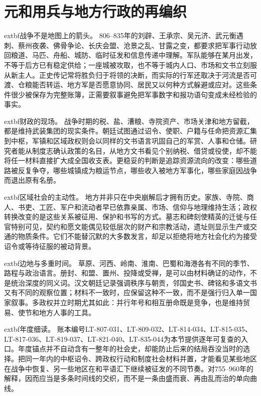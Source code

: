 \section{元和用兵与地方行政的再编织}
\label{sec:yuanhe-control-local-administration}

\noindent	extbf{战争不是地图上的箭头。} 806--835年的刘辟、王承宗、吴元济、武元衡遇刺、蔡州夜袭、佛骨争论、长庆会盟、沧景之乱、甘露之变，都要求把军事行动放回粮道、马匹、舟船、城防、临时征发和信息传递中理解。军队能够在某月出发，不等于后方已有稳定供给；一座城被攻取，也不等于城内人口、市场和文书立刻服从新主人。正史传记常将胜负归于将领的决断，而实际的行军还取决于河流是否可渡、仓粮能否转运、地方军是否愿意协同、居民又以何种方式躲避或应对。这些条件很少被保存为完整账簿，正需要叙事避免把军事数字和报功语句变成未经检验的事实。

\noindent	extbf{财政的现场。} 战争时期的税、盐、漕粮、寺院资产、市场关津和地方留截，都是维持武装集团的现实条件。朝廷试图通过诏令、使职、户籍与任命把资源汇集到中枢，军镇和区域政权则会以同样的文书语言巩固自己的军赏、人事和仓储。研究者能从制度志确认政策的名目，从地方文书看见个别纳税、借贷或役使，却不能将任一材料直接扩大成全国收支表。更稳妥的判断是追踪资源流向的改变：哪些道路被反复争夺，哪些城镇成为粮运节点，哪些收入被地方军事化，哪些家庭因战争而退出原有名册。

\noindent	extbf{区域社会的主动性。} 地方并非只在中央崩解后才拥有历史。家族、寺院、商人、书吏、工匠、军户和流动者早已依靠亲属、市场、信仰与地理维持生活；政权转换改变的是这些关系被征用、保护和书写的方式。墓志和碑刻使精英的迁徙与任官特别可见，契约和愿文能偶见较低层次的财产和宗教活动，遗址则显示生产或交通的物质条件。它们不能替沉默的大多数发言，却足以拒绝将地方社会化约为接受诏令或等待征服的被动背景。

\noindent	extbf{边地与多重时间。} 草原、河西、岭南、淮南、巴蜀和海港各有不同的季节、路程与政治语言。册封、和盟、置州、投降或受禅，是可以由材料确证的动作，不是统治深度的同义词。汉文朝廷记录强调秩序与朝贡，邻国史书、碑铭和多语文书又有不同的观察位置；材料不一致时，应保留这种不一致，而不是强行归入单一国家叙事。多政权并立时期尤其如此：并行年号和相互册命既是竞争，也是维持贸易、使节和地方人事的工具。

\noindent	extbf{年度细读。} 账本编号LT-807-031、LT-809-032、LT-814-034、LT-815-035、LT-817-036、LT-819-037、LT-821-040、LT-835-044为本节提供逐年可复查的入口。年度锚点并不自动含有一整年的社会史，却能防止后来的结局吞没当时的选择。把同一年内的中枢诏令、跨政权行动和制度社会材料并置，才能看见某些地区在战争中恢复、另一些地区在和平语汇下继续被征发的不同节奏。对755--960年的解释，因而应当是多条时间线的交织，而不是一条由盛而衰、再由乱而治的单向曲线。


